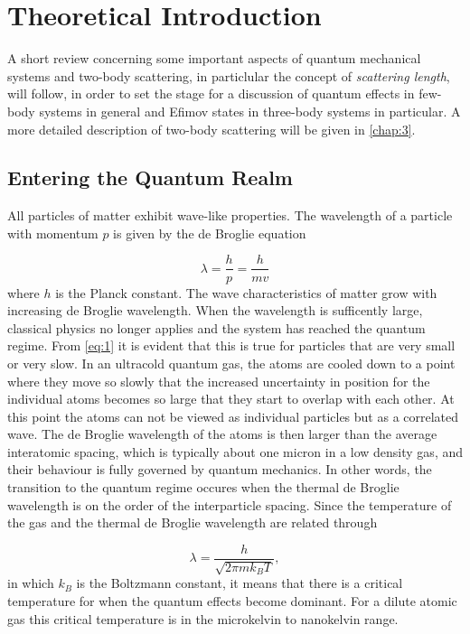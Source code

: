 \section{Theoretical Introduction}
A short review concerning some important aspects of quantum mechanical systems and two-body scattering, in particlular the concept of \emph{scattering length}, will follow, in order to set the stage for a discussion of quantum effects in few-body systems in general and Efimov states in three-body systems in particular. A more detailed description of two-body scattering will be given in \cref{chap:3}.

\subsection{Entering the Quantum Realm}
All particles of matter exhibit wave-like properties. The wavelength of a particle with momentum $p$ is given by the de Broglie equation

\begin{equation} \label{eq:1}
\lambda = \frac{h}{p} = \frac{h}{mv}
\end{equation}
where $h$ is the Planck constant. The wave characteristics of matter grow with increasing de Broglie wavelength. When the wavelength is sufficently large, classical physics no longer applies and the system has reached the quantum regime. From \ref{eq:1} it is evident that this is true for particles that are very small or very slow. In an ultracold quantum gas, the atoms are cooled down to a point where they move so slowly that the increased uncertainty in position for the individual atoms becomes so large that they start to overlap with each other. At this point the atoms can not be viewed as individual particles but as a correlated wave. The de Broglie wavelength of the atoms is then larger than the average interatomic spacing, which is typically about one micron in a low density gas, and their behaviour is fully governed by quantum mechanics. In other words, the transition to the quantum regime occures when the thermal de Broglie wavelength is on the order of the interparticle spacing. Since the temperature of the gas and the thermal de Broglie wavelength are related through

\begin{equation}
\lambda = \frac{h}{\sqrt{2\pi m k_B T}},
\end{equation}
in which $k_B$ is the Boltzmann constant, it means that there is a critical temperature for when the quantum effects become dominant. For a dilute atomic gas this critical temperature is in the microkelvin to nanokelvin range.

